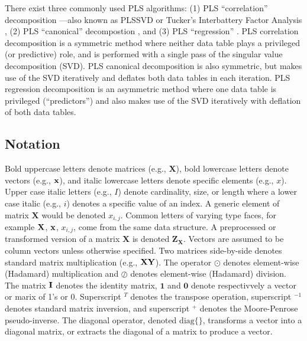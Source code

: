 \documentclass[12pt]{article}
\begin{document}
There exist three commonly used PLS algorithms: (1) PLS ``correlation''
decomposition
\citetext{\citealp[partial\_2011]{krishnan}; \citealp{bookstein1994partial}; \citealp[spatial\_1996]{mcintosh}}---also
known as PLSSVD \citep[regression\_1998]{tenenhaus} or Tucker's
Interbattery Factor Analysis \citep[inter-battery\_1958]{tucker}, (2)
PLS ``canonical'' decompostion \citep[regression\_1998]{tenenhaus}, and
(3) PLS ``regression''
\citetext{\citealp[soft\_1975]{wold}; \citealp[collinearity\_1984]{wold}; \citealp[pls-regression\_2001]{wold}}.
PLS correlation decomposition is a symmetric method where neither data
table plays a privileged (or predictive) role, and is performed with a
single pass of the singular value decomposition (SVD). PLS canonical
decomposition is also symmetric, but makes use of the SVD iteratively
and deflates both data tables in each iteration. PLS regression
decomposition is an asymmetric method where one data table is privileged
(``predictors'') and also makes use of the SVD iteratively with
deflation of both data tables.

\hypertarget{notation}{%
\subsection{Notation}\label{notation}}

Bold uppercase letters denote matrices (e.g., \(\mathbf{X}\)), bold
lowercase letters denote vectors (e.g., \(\bf{x}\)), and italic
lowercase letters denote specific elements (e.g., \(x\)). Upper case
italic letters (e.g., \(I\)) denote cardinality, size, or length where a
lower case italic (e.g., \(i\)) denotes a specific value of an index. A
generic element of matrix \(\mathbf{X}\) would be denoted \(x_{i,j}\).
Common letters of varying type faces, for example \({\bf X}\),
\(\bf{x}\), \(x_{i,j}\), come from the same data structure. A
preprocessed or transformed version of a matrix \({\mathbf X}\) is
denoted \({\mathbf Z}_{\mathbf X}\). Vectors are assumed to be column
vectors unless otherwise specified. Two matrices side-by-side denotes
standard matrix multiplication (e.g., \(\bf{X}\bf{Y}\)). The operator
\(\odot\) denotes element-wise (Hadamard) multiplication and \(\oslash\)
denotes element-wise (Hadamard) division. The matrix \({\bf I}\) denotes
the identity matrix, \(\mathbf{1}\) and \(\mathbf{0}\) denote
respectivvely a vector or marix of 1's or 0. Superscript \(^{T}\)
denotes the transpose operation, superscript \(^{-1}\) denotes standard
matrix inversion, and superscript \(^{+}\) denotes the Moore-Penrose
pseudo-inverse. The diagonal operator, denoted \(\mathrm{diag\{\}}\),
transforms a vector into a diagonal matrix, or extracts the diagonal of
a matrix to produce a vector.
\end{document}

